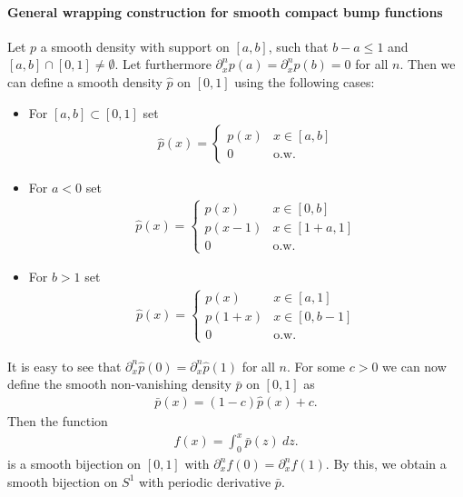 \documentclass{article}
\begin{document}
\paragraph{General wrapping construction for smooth compact bump functions}
Let $p$  a smooth density with support on $[a, b]$, such that $b - a \leq 1$ and $[a, b] \cap [0, 1] \neq \emptyset$. Let furthermore $\partial^{n}_{x} p(a) = \partial^{n}_{x} p(b) = 0$ for all $n$. Then we can define a smooth density $\hat p$ on $[0,1]$ using the following cases:
\begin{itemize}
    \item For $[a, b] \subset [0,1]$ set
    \begin{align}
        \hat p(x) = \begin{cases}
        p(x) & x \in [a, b] \\
        0 & \mathrm{o.w.}
        \end{cases}
    \end{align}
    \item For $a < 0$ set
    \begin{align}
        \hat p(x) = \begin{cases}
        p(x) & x \in [0, b] \\
        p(x - 1) & x \in [1 + a, 1] \\
        0 & \mathrm{o.w.}
        \end{cases}
    \end{align}
    \item For $b > 1$ set
    \begin{align}
        \hat p(x) = \begin{cases}
        p(x) & x \in [a, 1] \\
        p(1+x) & x \in [0, b - 1] \\
        0 & \mathrm{o.w.}
        \end{cases}
    \end{align}
\end{itemize}
It is easy to see that $\partial^{n}_{x} \hat p(0) = \partial^{n}_{x} \hat p(1)$ for all $n$.
For some $c > 0$ we can now define the smooth non-vanishing density $\bar p$ on $[0,1]$ as
\begin{align}
    \bar p(x) = (1-c) \hat p(x) + c.
\end{align}
Then the function
\begin{align}
    f(x) = \int_{0}^{x} \bar p(z) ~ dz. \label{eq:smooth-circular-transformation-as-density-integral}
\end{align}
is a smooth bijection on $[0,1]$ with $\partial^{n}_{x} f(0) = \partial^{n}_{x} f(1)$. By this, we obtain a smooth bijection on $S^1$ with periodic derivative $\bar p$.
\end{document}

